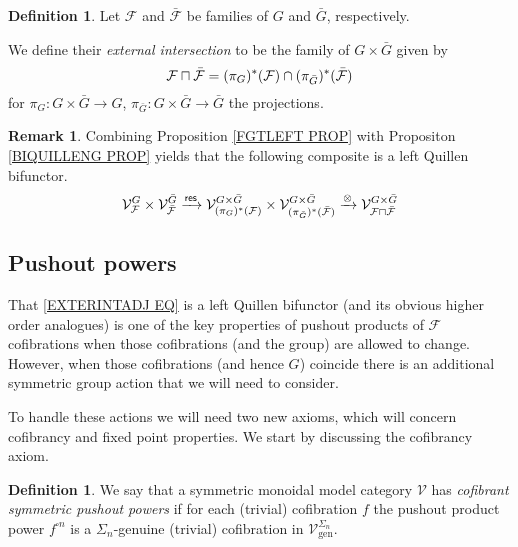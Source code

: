 \documentclass[a4paper,10pt
,draft
]{article}%
\numberwithin{equation}{section}
\numberwithin{figure}{section}
\theoremstyle{definition} %
\newtheorem{definition}[equation]{Definition}%
\newtheorem{remark}[equation]{Remark}%
\newcommand{\V}{\ensuremath{\mathcal V}}
\newcommand{\1}{\ensuremath{\mathbbm 1}}%
\begin{document}
\begin{definition}\label{EXTERINT DEF}
Let $\mathcal{F}$ and $\bar{\mathcal{F}}$ be families of $G$ and $\bar{G}$, respectively.

We define their \textit{external intersection} to be the 
family of $G \times \bar{G}$ given by
\[
	\mathcal{F} \sqcap \bar{\mathcal{F}}
=
	(\pi_{G})^{\**} (\mathcal{F}) 
		\cap
	(\pi_{\bar{G}})^{\**} (\bar{\mathcal{F}})
\]
for 
$\pi_G \colon G \times \bar{G} \to G$,
$\pi_{\bar{G}} \colon G \times \bar{G} \to \bar{G}$
the projections.
\end{definition}


\begin{remark}
	Combining Proposition \ref{FGTLEFT PROP} 
	with Propositon \ref{BIQUILLENG PROP} yields that
	the following composite is a left Quillen bifunctor.
\begin{equation}\label{EXTERINTADJ EQ}
	\mathcal{V}^{G}_{\mathcal{F}}
		\times
	\mathcal{V}^{\bar{G}}_{\bar{\mathcal{F}}}
		\xrightarrow{\mathsf{res}}
	\mathcal{V}^{G \times \bar{G}}_{
	(\pi_G)^{\**}(\mathcal{F})}
		\times
	\mathcal{V}^{G \times \bar{G}}_{
	(\pi_{\bar{G}})^{\**}(\bar{\mathcal{F}})}
		\xrightarrow{\otimes}
	\mathcal{V}^{G \times \bar{G}}_{
	\mathcal{F} \sqcap \bar{\mathcal{F}}}
\end{equation}
\end{remark}


\subsection{Pushout powers}\label{PUSHPOW SEC}

That \eqref{EXTERINTADJ EQ} is a left Quillen bifunctor (and its obvious higher order analogues) is one of the key properties of pushout products of $\mathcal{F}$ cofibrations when those cofibrations (and the group) are allowed to change. However, when those cofibrations (and hence $G$) coincide there is an additional symmetric group action that  we will need to consider.

To handle these actions we will need two new axioms, 
which will concern cofibrancy and fixed point properties. We start by discussing the cofibrancy axiom.


\begin{definition}\label{COFSYMPUSHPOW}
	We say that a symmetric monoidal model category $\mathcal{V}$ has 
	\textit{cofibrant symmetric pushout powers}
	if for each (trivial) cofibration $f$ the pushout product power 
	$f^{\square n}$ is a $\Sigma_n$-genuine 
	(trivial) cofibration in $\V^{\Sigma_n}_{\text{gen}}$.
\end{definition}
\end{document}
